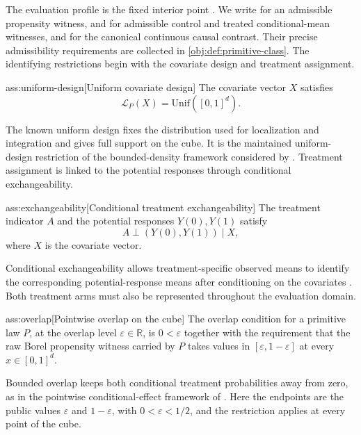 The evaluation profile is the fixed interior point . We write  for an admissible propensity witness,  and  for admissible control and treated conditional-mean witnesses, and  for the canonical continuous causal contrast. Their precise admissibility requirements are collected in \cref{obj:def:primitive-class}. The identifying restrictions begin with the covariate design and treatment assignment.

\begin{assumptionv}{ass:uniform-design}[Uniform covariate design]
The covariate vector \(X\) satisfies
\[
\mathcal L_P(X)=\mathrm{Unif}([0,1]^d).
\]
\end{assumptionv}

The known uniform design fixes the distribution used for localization and integration and gives full support on the cube. It is the maintained uniform-design restriction of the bounded-density framework considered by \citep{KennedyBalakrishnanRobinsWasserman2024}. Treatment assignment is linked to the potential responses through conditional exchangeability.

\begin{assumptionv}{ass:exchangeability}[Conditional treatment exchangeability]
The treatment indicator \(A\) and the potential responses \(Y(0),Y(1)\) satisfy
\[
A\perp(Y(0),Y(1))\mid X,
\]
where \(X\) is the covariate vector.
\end{assumptionv}

Conditional exchangeability allows treatment-specific observed means to identify the corresponding potential-response means after conditioning on the covariates \citep{ChakraborttyDai2022}. Both treatment arms must also be represented throughout the evaluation domain.

\begin{assumptionv}{ass:overlap}[Pointwise overlap on the cube]
The overlap condition for a primitive law \(P\), at the overlap level \(\varepsilon\in\mathbb R\), is \(0<\varepsilon\) together with the requirement that the raw Borel propensity witness carried by \(P\) takes values in \([\varepsilon,1-\varepsilon]\) at every \(x\in[0,1]^d\).
\end{assumptionv}

Bounded overlap keeps both conditional treatment probabilities away from zero, as in the pointwise conditional-effect framework of \citep{KennedyBalakrishnanRobinsWasserman2024}. Here the endpoints are the public values \(\varepsilon\) and \(1-\varepsilon\), with \(0<\varepsilon<1/2\), and the restriction applies at every point of the cube.

